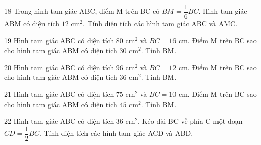 \gap
\begin{probbox}{18}{\relax}
Trong hình tam giác ABC, điểm M trên BC có $BM=\dfrac{1}{6}BC$. Hình tam giác ABM có diện tích $12$ cm$^2$. Tính diện tích các hình tam giác ABC và AMC.
\end{probbox}
\gap
\begin{probbox}{19}{\relax}
Hình tam giác ABC có diện tích $80$ cm$^2$ và $BC=16$ cm. Điểm M trên BC sao cho hình tam giác ABM có diện tích $30$ cm$^2$. Tính BM.
\end{probbox}
\gap
\begin{probbox}{20}{\relax}
Hình tam giác ABC có diện tích $96$ cm$^2$ và $BC=12$ cm. Điểm M trên BC sao cho hình tam giác ABM có diện tích $36$ cm$^2$. Tính BM.
\end{probbox}
\gap
\begin{probbox}{21}{\relax}
Hình tam giác ABC có diện tích $75$ cm$^2$ và $BC=10$ cm. Điểm M trên BC sao cho hình tam giác ABM có diện tích $45$ cm$^2$. Tính BM.
\end{probbox}
\gap
\begin{probbox}{22}{\relax}
Hình tam giác ABC có diện tích $36$ cm$^2$. Kéo dài BC về phía C một đoạn $CD=\dfrac12BC$. Tính diện tích các hình tam giác ACD và ABD.
\end{probbox}
